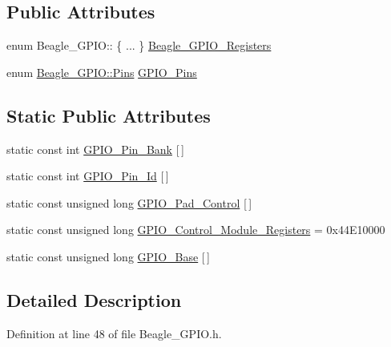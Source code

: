 \subsection*{\-Public \-Attributes}
\begin{DoxyCompactItemize}
\item 
enum \-Beagle\-\_\-\-G\-P\-I\-O\-:: \{ ... \}  \hyperlink{class_beagle___g_p_i_o_a0164dbfd9376ef3a1e0a404d5cf2f431}{\-Beagle\-\_\-\-G\-P\-I\-O\-\_\-\-Registers}
\item 
enum \hyperlink{class_beagle___g_p_i_o_a9b1fd560ea5d2d65898ac15c23055e58}{\-Beagle\-\_\-\-G\-P\-I\-O\-::\-Pins} \hyperlink{class_beagle___g_p_i_o_ae173a49845ccc4d980cc0eb83a990418}{\-G\-P\-I\-O\-\_\-\-Pins}
\end{DoxyCompactItemize}
\subsection*{\-Static \-Public \-Attributes}
\begin{DoxyCompactItemize}
\item 
static const int \hyperlink{class_beagle___g_p_i_o_ae7919c981429a17c48c601664a61d64a}{\-G\-P\-I\-O\-\_\-\-Pin\-\_\-\-Bank} \mbox{[}$\,$\mbox{]}
\item 
static const int \hyperlink{class_beagle___g_p_i_o_a9a48339b54de8e6c884ddad8629a3647}{\-G\-P\-I\-O\-\_\-\-Pin\-\_\-\-Id} \mbox{[}$\,$\mbox{]}
\item 
static const unsigned long \hyperlink{class_beagle___g_p_i_o_ae4a0a2a56a0ba31145a5f41eb3439886}{\-G\-P\-I\-O\-\_\-\-Pad\-\_\-\-Control} \mbox{[}$\,$\mbox{]}
\item 
static const unsigned long \hyperlink{class_beagle___g_p_i_o_a45dea13988842b47f592806fd15f1262}{\-G\-P\-I\-O\-\_\-\-Control\-\_\-\-Module\-\_\-\-Registers} = 0x44\-E10000
\item 
static const unsigned long \hyperlink{class_beagle___g_p_i_o_ab259232b938bf1892836737c07610384}{\-G\-P\-I\-O\-\_\-\-Base} \mbox{[}$\,$\mbox{]}
\end{DoxyCompactItemize}


\subsection{\-Detailed \-Description}


\-Definition at line 48 of file \-Beagle\-\_\-\-G\-P\-I\-O.\-h.



